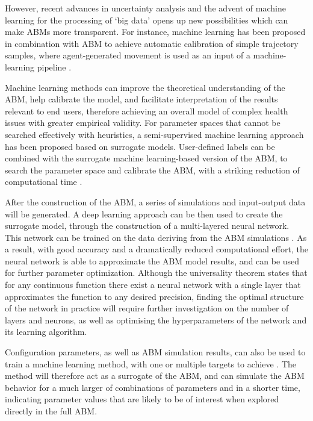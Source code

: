 \documentclass[review]{elsarticle}
\begin{document}
However, recent advances in uncertainty analysis and the advent of machine learning for the processing of `big data' opens up new possibilities which can make ABMs more transparent. For instance, machine learning has been proposed in combination with ABM to achieve automatic calibration of simple trajectory samples, where agent-generated movement is used as an input of a machine-learning pipeline \citep{torrens2011building}. 

Machine learning methods can improve the theoretical understanding of the ABM, help calibrate the model, and facilitate interpretation of the results relevant to end users, therefore achieving an overall model of complex health issues with greater empirical validity.
For parameter spaces that cannot be searched effectively with heuristics, a semi-supervised machine learning approach has been proposed based on surrogate models.  User-defined labels can be combined with the surrogate machine learning-based version of the ABM, to search the parameter space and calibrate the ABM, with a striking reduction of computational time \citep{pereda2017brief,lamperti2017agent}. 

After the construction of the ABM, a series of simulations and input-output data will be generated. A deep learning approach can be then used to create the surrogate model, through the construction of a multi-layered neural network. This network can be trained on the data deriving from the ABM simulations \citep{van2017deep}. As a result, with good accuracy and a dramatically reduced computational effort, the neural network is able to approximate the ABM model results, and can be used for further parameter optimization. Although the universality theorem states that for any continuous function there exist a neural network with a single layer that approximates the function to any desired precision, finding the optimal structure of the network in practice will require further investigation on the number of layers and neurons, as well as optimising the hyperparameters of the network and its learning algorithm.

Configuration parameters, as well as ABM simulation results, can also be used to train a machine learning method, with one or multiple targets to achieve \citep{furtado2017machine}. The method will therefore act as a surrogate of the ABM, and can simulate the ABM behavior for a much larger of combinations of parameters and in a shorter time, indicating parameter values that are likely to be of interest when explored directly in the full ABM. 
\end{document}
